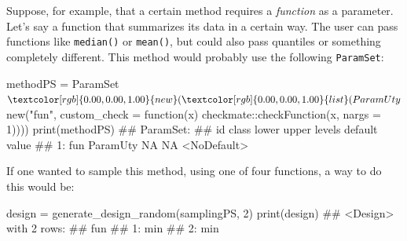 \documentclass[
  11pt,
  parskip=half,
  DIV=calc,
  BCOR=10mm,
  x11names]{scrbook}
\newenvironment{Shaded}{}{}
\newcommand{\CommentTok}[1]{\textcolor[rgb]{0.00,0.50,0.00}{#1}}
\newcommand{\ControlFlowTok}[1]{\textcolor[rgb]{0.00,0.00,1.00}{#1}}
\newcommand{\DataTypeTok}[1]{#1}
\newcommand{\DecValTok}[1]{#1}
\newcommand{\KeywordTok}[1]{\textcolor[rgb]{0.00,0.00,1.00}{#1}}
\newcommand{\NormalTok}[1]{#1}
\newcommand{\OperatorTok}[1]{#1}
\newcommand{\StringTok}[1]{\textcolor[rgb]{0.00,0.50,0.50}{#1}}
\begin{document}
Suppose, for example, that a certain method requires a \emph{function} as a parameter.
Let's say a function that summarizes its data in a certain way.
The user can pass functions like \texttt{median()} or \texttt{mean()}, but could also pass quantiles or something completely different.
This method would probably use the following \texttt{ParamSet}:

\begin{Shaded}
\begin{Highlighting}[]
\NormalTok{methodPS =}\StringTok{ }\NormalTok{ParamSet}\OperatorTok{$}\KeywordTok{new}\NormalTok{(}\KeywordTok{list}\NormalTok{(ParamUty}\OperatorTok{$}\KeywordTok{new}\NormalTok{(}\StringTok{"fun"}\NormalTok{, }\DataTypeTok{custom_check =} \ControlFlowTok{function}\NormalTok{(x) checkmate}\OperatorTok{::}\KeywordTok{checkFunction}\NormalTok{(x, }
  \DataTypeTok{nargs =} \DecValTok{1}\NormalTok{))))}
\KeywordTok{print}\NormalTok{(methodPS)}
\NormalTok{## ParamSet: }
\NormalTok{##     id    class lower upper levels     default value}
\NormalTok{## 1: fun ParamUty    NA    NA        <NoDefault>}
\end{Highlighting}
\end{Shaded}

If one wanted to sample this method, using one of four functions, a way to do this would be:

\begin{Shaded}
\end{Shaded}

\begin{Shaded}
\begin{Highlighting}[]
\NormalTok{design =}\StringTok{ }\KeywordTok{generate_design_random}\NormalTok{(samplingPS, }\DecValTok{2}\NormalTok{)}
\KeywordTok{print}\NormalTok{(design)}
\NormalTok{## <Design> with 2 rows:}
\NormalTok{##    fun}
\NormalTok{## 1: min}
\NormalTok{## 2: min}
\end{Highlighting}
\end{Shaded}
\end{document}
